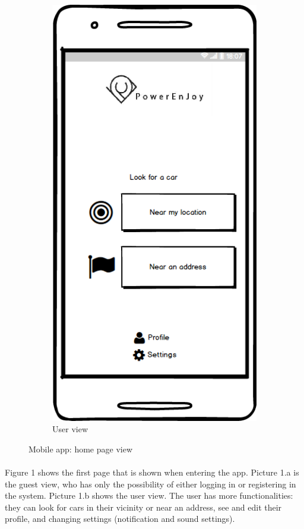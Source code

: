 \begin{figure}[h]
\begin{subfigure}{0.5\textwidth}
			\includegraphics[scale=0.35]{img/mockups/App_user.png}
			\caption{User view}
			\label{fig:subim2}
		\end{subfigure}
 
		\caption{Mobile app: home page view}
		\label{fig:image1}
	\end{figure}
	
	\paragraph{} Figure 1 shows the first page that is shown when entering the app. Picture 1.a is the guest view, who has only the possibility of either logging in or registering in the system. Picture 1.b shows the user view. The user has more functionalities: they can look for cars in their vicinity or near an address, see and edit their profile, and changing settings (notification and sound settings). 
	
